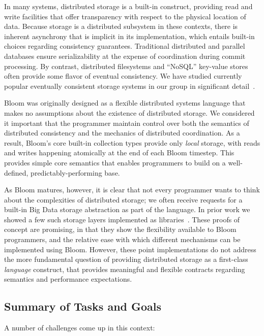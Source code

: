 In many systems, distributed storage is a built-in construct, providing read and
write facilities that offer transparency with respect to the physical location
of data.  Because storage is a distributed subsystem in these contexts, there is
inherent asynchrony that is implicit in its implementation, which  entails
built-in choices regarding consistency guarantees. Traditional distributed and
parallel databases ensure serializability at the expense of coordination during
commit processing.  By contrast, distributed filesystems and ``NoSQL'' key-value
stores often provide some flavor of eventual consistency.  We have studied
currently popular eventually consistent storage systems in our group in significant detail~\cite{boom-eurosys,bailis,bloom-lattice-tr}.

Bloom was originally designed as a flexible distributed systems language that
makes no assumptions about the existence of distributed storage.  We considered
it important that the programmer maintain control over both the semantics of
distributed consistency and the mechanics of distributed coordination.  As a
result, Bloom's core built-in collection types provide only \emph{local}
storage, with reads and writes happening atomically at the end of each Bloom
timestep.  This provides simple core semantics that enables programmers to build
on a well-defined, predictably-performing base.

As Bloom matures, however, it is clear that not every programmer wants to think
about the complexities of distributed storage; we often receive requests for a
built-in Big Data storage abstraction as part of the language.  In prior work we
showed a few such storage layers implemented as
libraries~\cite{boom-eurosys,bud-sandbox,bloom-lattice-tr}.  These proofs of
concept are promising, in that they show the flexibility available to Bloom
programmers, and the relative ease with which different mechanisms can be
implemented using Bloom.  However, these point implementations do not address
the more fundamental question of providing distributed storage as a first-class
\emph{language} construct, that provides meaningful and flexible contracts
regarding semantics and performance expectations.

\subsection{Summary of Tasks and Goals}
A number of challenges come up in this context:

